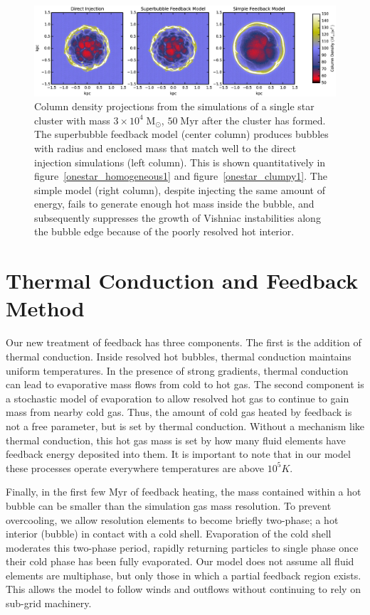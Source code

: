 \begin{figure}
    \includegraphics[width=\textwidth]{figures1/onestar_column.eps}
    \caption[Column density plot of a superbubble from a single cluster]{Column
    density projections from the simulations of a single star cluster with mass
    $3\times10^4\;\mathrm{M_\odot}$, $50\;\mathrm{Myr}$ after the cluster has
    formed.  The superbubble feedback model (center column) produces bubbles
    with radius and enclosed mass that match well to the direct injection
    simulations (left column).  This is shown quantitatively in
    figure~\ref{onestar_homogeneous1} and figure~\ref{onestar_clumpy1}.  The
    simple model (right column), despite injecting the same amount of energy,
    fails to generate enough hot mass inside the bubble, and subsequently
    suppresses the growth of Vishniac instabilities along the bubble edge
    because of the poorly resolved hot interior.}
    \label{onestar_column1}
\end{figure}


\section{Thermal Conduction and Feedback Method}\label{method1}
Our new treatment of feedback has three components.  The first is the addition
of thermal conduction.   Inside resolved hot bubbles, thermal conduction
maintains uniform temperatures.   In the presence of strong gradients, thermal
conduction can lead to evaporative mass flows from cold to hot gas.  The second
component is a stochastic model of evaporation to allow resolved hot gas to
continue to gain mass from nearby cold gas.  Thus, the amount of cold gas heated
by feedback is not a free parameter, but is set by thermal conduction.  
Without a mechanism like thermal conduction, this hot gas mass is set by
how many fluid elements have feedback energy deposited into them.   It is
important to note that in our model these processes operate everywhere
temperatures are above $10^5K$. 

Finally, in the first few $\mathrm{Myr}$ of feedback heating, the mass contained
within a hot bubble can be smaller than the simulation gas mass resolution.  To
prevent overcooling, we allow resolution elements to become briefly two-phase; a
hot interior (bubble) in contact with a cold shell.  Evaporation of the cold
shell moderates this two-phase period, rapidly returning particles to single
phase once their cold phase has been fully evaporated.  Our model does not
assume all fluid elements are multiphase, but only those in which a partial
feedback region exists.  This allows the model to follow winds and outflows
without continuing to rely on sub-grid machinery.  

